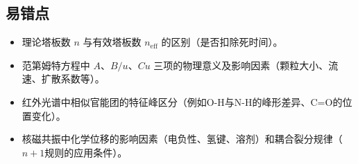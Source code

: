 \documentclass[11pt,a4paper]{article}
\begin{document}
\subsection{易错点}
\begin{itemize}
    \item 理论塔板数 \( n \) 与有效塔板数 \( n_{\text{eff}} \) 的区别（是否扣除死时间）。
    \item 范第姆特方程中 \( A \)、\( B/u \)、\( C u \) 三项的物理意义及影响因素（颗粒大小、流速、扩散系数等）。
    \item 红外光谱中相似官能团的特征峰区分（例如O-H与N-H的峰形差异、C=O的位置变化）。
    \item 核磁共振中化学位移的影响因素（电负性、氢键、溶剂）和耦合裂分规律（\( n+1 \)规则的应用条件）。
\end{itemize}
\end{document}

